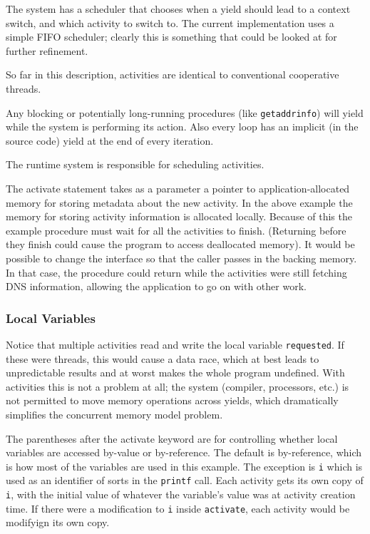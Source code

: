 \documentclass[10pt,preprint]{sigplanconf}
\begin{document}
The system has a scheduler that chooses when a yield should lead to a context switch, and which activity to switch to.
The current \charcoal{} implementation uses a simple FIFO scheduler; clearly this is something that could be looked at for further refinement.

So far in this description, activities are identical to conventional cooperative threads.


Any blocking or potentially long-running procedures (like \texttt{getaddrinfo}) will yield while the system is performing its action.
Also every loop has an implicit (in the source code) yield at the end of every iteration.

The runtime system is responsible for scheduling activities.



The activate statement takes as a parameter a pointer to application-allocated memory for storing metadata about the new activity.
In the above example the memory for storing activity information is allocated locally.
Because of this the example procedure must wait for all the activities to finish.
(Returning before they finish could cause the program to access deallocated memory).
It would be possible to change the interface so that the caller passes in the backing memory.
In that case, the procedure could return while the activities were still fetching DNS information, allowing the application to go on with other work.

\subsubsection{Local Variables}

Notice that multiple activities read and write the local variable \texttt{requested}.
If these were threads, this would cause a data race, which at best leads to unpredictable results and at worst makes the whole program undefined.
With activities this is not a problem at all; the system (compiler, processors, etc.) is not permitted to move memory operations across yields, which dramatically simplifies the concurrent memory model problem.

The parentheses after the activate keyword are for controlling whether local variables are accessed by-value or by-reference.
The default is by-reference, which is how most of the variables are used in this example.
The exception is \texttt{i} which is used as an identifier of sorts in the \texttt{printf} call.
Each activity gets its own copy of \texttt{i}, with the initial value of whatever the variable's value was at activity creation time.
If there were a modification to \texttt{i} inside \texttt{activate}, each activity would be modifyign its own copy.
\end{document}
